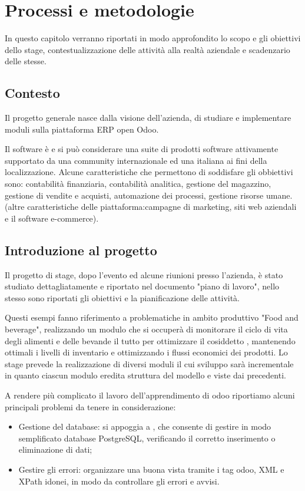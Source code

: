 
\hypertarget{(chap:capitolo2)}{}
\chapter{Processi e metodologie}
In questo capitolo verranno riportati in modo approfondito lo scopo e gli obiettivi dello stage, contestualizzazione delle attività alla realtà aziendale e scadenzario delle stesse.

\section{Contesto}
Il progetto generale nasce dalla visione dell'azienda, di studiare e implementare moduli sulla piattaforma ERP open Odoo.

Il software è  e si può considerare una suite di prodotti software attivamente supportato da una community internazionale ed una italiana ai fini della localizzazione.
Alcune caratteristiche che permettono di soddisfare gli obbiettivi sono: contabilità finanziaria, contabilità analitica, gestione del magazzino, gestione di vendite e acquisti, automazione dei processi, gestione risorse umane. (altre caratteristiche delle piattaforma:campagne di marketing, siti web aziendali e il software e-commerce).

\section{Introduzione al progetto}
Il progetto di stage, dopo l'evento  ed alcune riunioni presso l'azienda, è stato studiato dettagliatamente e riportato nel documento "piano di lavoro", nello stesso sono riportati gli obiettivi e la pianificazione delle attività.

Questi esempi fanno riferimento a problematiche in ambito produttivo "Food and beverage", realizzando un modulo che si occuperà di monitorare il ciclo di vita degli alimenti e delle bevande il tutto per ottimizzare il cosiddetto , mantenendo ottimali i livelli di inventario e ottimizzando i flussi economici dei prodotti.
Lo stage prevede la realizzazione di diversi moduli il cui sviluppo sarà incrementale in quanto ciascun modulo eredita struttura del modello e viste dai precedenti.

A rendere più complicato il lavoro dell'apprendimento di odoo riportiamo alcuni principali problemi da tenere in considerazione:
\begin{itemize}
	\item Gestione del database: si appoggia a , che consente di gestire in modo semplificato database PostgreSQL, verificando il corretto inserimento o eliminazione di dati;
	\item Gestire gli errori: organizzare una buona vista tramite i tag odoo, XML e XPath idonei, in modo da controllare gli errori e avvisi.
\end{itemize}

